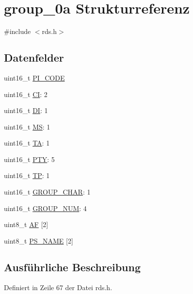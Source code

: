 \hypertarget{structgroup__0a}{}\section{group\+\_\+0a Strukturreferenz}
\label{structgroup__0a}


{\ttfamily \#include $<$rds.\+h$>$}

\subsection*{Datenfelder}
\begin{DoxyCompactItemize}
\item 
uint16\+\_\+t \hyperlink{structgroup__0a_a5cd9b1f6413028425796c1129aa8fd87}{P\+I\+\_\+\+C\+O\+D\+E}
\item 
uint16\+\_\+t \hyperlink{structgroup__0a_aa6fd8556e02ce89fed23057f1cb37e44}{C\+I}\+: 2
\item 
uint16\+\_\+t \hyperlink{structgroup__0a_ad020d0abff338c9c34924a44478ac591}{D\+I}\+: 1
\item 
uint16\+\_\+t \hyperlink{structgroup__0a_a0d87191040df43fdd9f67487d0cc1a45}{M\+S}\+: 1
\item 
uint16\+\_\+t \hyperlink{structgroup__0a_a6de7751205cef4ffcce610399a030892}{T\+A}\+: 1
\item 
uint16\+\_\+t \hyperlink{structgroup__0a_a0474967478fbbc2c71b800d2e0132d45}{P\+T\+Y}\+: 5
\item 
uint16\+\_\+t \hyperlink{structgroup__0a_ab9e634c63b0d95a96716d5f6d7f06d72}{T\+P}\+: 1
\item 
uint16\+\_\+t \hyperlink{structgroup__0a_a66d4119990dc4c3e040a43885e9bb953}{G\+R\+O\+U\+P\+\_\+\+C\+H\+A\+R}\+: 1
\item 
uint16\+\_\+t \hyperlink{structgroup__0a_a9f692e9f76ee88348d426bcd4e9bc70b}{G\+R\+O\+U\+P\+\_\+\+N\+U\+M}\+: 4
\item 
uint8\+\_\+t \hyperlink{structgroup__0a_ae5a8515ae995b21e542b2ad52b20c34e}{A\+F} \mbox{[}2\mbox{]}
\item 
uint8\+\_\+t \hyperlink{structgroup__0a_a80447425671c19133df16d620705bb09}{P\+S\+\_\+\+N\+A\+M\+E} \mbox{[}2\mbox{]}
\end{DoxyCompactItemize}


\subsection{Ausführliche Beschreibung}


Definiert in Zeile 67 der Datei rds.\+h.



